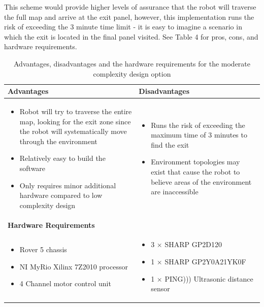 \documentclass[a4paper]{article}
\begin{document}
This scheme would provide higher levels of assurance that the robot will traverse the full map and arrive at the exit panel, however, this implementation runs the risk of exceeding the 3 minute time limit - it is easy to imagine a scenario in which the exit is located in the final panel visited. See Table 4 for pros, cons, and hardware requirements.

\begin{table}[h]
\centering
\caption{Advantages, disadvantages and the hardware requirements for the moderate complexity design option}
\small\begin{tabular}{p{8cm}p{8cm}}
\toprule
\textbf{Advantages} & \textbf{Disadvantages}\\
\midrule
\begin{itemize}\item Robot will try to traverse the entire map, looking for the exit zone since the robot will systematically move through the environment \item Relatively easy to build the software \item Only requires minor additional hardware compared to low complexity design \end{itemize} &
\begin{itemize}\item Runs the risk of exceeding the maximum time of 3 minutes to find the exit \item Environment topologies may exist that cause the robot to believe areas of the environment are inaccessible \end{itemize}\\
\midrule
\textbf{Hardware Requirements} & \\
\midrule
\begin{itemize}\item Rover 5 chassis \item NI MyRio Xilinx 7Z2010 processor \item 4 Channel motor control unit \end{itemize} & \begin{itemize} \item 3 $\times$ SHARP GP2D120 \item 1 $\times$ SHARP GP2Y0A21YK0F \item 1 $\times$ PING))) Ultrasonic distance sensor \end{itemize}\\
\bottomrule
\end{tabular}
\end{table}
\end{document}
